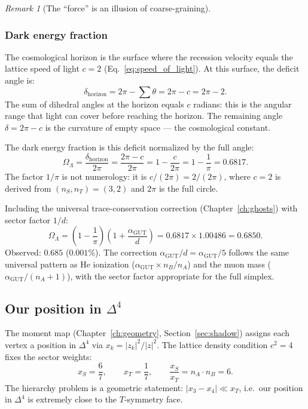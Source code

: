 \documentclass[12pt]{article}
\theoremstyle{remark}
\newtheorem{remark}[theorem]{Remark}
\theoremstyle{definition}
\begin{document}
\begin{remark}[The ``force'' is an illusion of coarse-graining]
\subsubsection{Dark energy fraction}

The cosmological horizon is the surface where the recession velocity equals the lattice speed of light $c = 2$ (Eq.~\ref{eq:speed_of_light}). At this surface, the deficit angle is:
\begin{equation}
\delta_\text{horizon} = 2\pi - \sum\theta = 2\pi - c = 2\pi - 2.
\end{equation}
The sum of dihedral angles at the horizon equals $c$ radians: this is the angular range that light can cover before reaching the horizon. The remaining angle $\delta = 2\pi - c$ is the curvature of empty space --- the cosmological constant.

The dark energy fraction is this deficit normalized by the full angle:
\begin{equation}
\boxed{\Omega_\Lambda = \frac{\delta_\text{horizon}}{2\pi} = \frac{2\pi - c}{2\pi} = 1 - \frac{c}{2\pi} = 1 - \frac{1}{\pi} = 0.6817.}
\end{equation}
The factor $1/\pi$ is not numerology: it is $c/(2\pi) = 2/(2\pi)$, where $c = 2$ is derived from $(n_S, n_T) = (3, 2)$ and $2\pi$ is the full circle.

Including the universal trace-conservation correction (Chapter~\ref{ch:ghosts}) with sector factor $1/d$:
\begin{equation}
\boxed{\Omega_\Lambda = \left(1 - \frac{1}{\pi}\right)\!\left(1 + \frac{\alpha_\mathrm{GUT}}{d}\right) = 0.6817 \times 1.00486 = 0.6850.}
\end{equation}
Observed: $0.685$ ($0.001\%$).  The correction $\alpha_\mathrm{GUT}/d = \alpha_\mathrm{GUT}/5$ follows the same universal pattern as He ionization ($\alpha_\mathrm{GUT} \times n_B/n_A$) and the muon mass ($\alpha_\mathrm{GUT}/(n_A+1)$), with the sector factor appropriate for the full simplex.

\subsection{Our position in $\Delta^4$}
\label{sec:our_position}

The moment map (Chapter~\ref{ch:geometry}, Section~\ref{sec:shadow}) assigns each vertex a position in $\Delta^4$ via $x_k = |z_k|^2/|z|^2$.  The lattice density condition $c^2 = 4$ fixes the sector weights:
\begin{equation}
x_S = \frac{6}{7}, \qquad x_T = \frac{1}{7}, \qquad \frac{x_S}{x_T} = n_A \cdot n_B = 6.
\end{equation}
The hierarchy problem is a geometric statement: $|x_3 - x_4| \ll x_T$, i.e.\ our position in $\Delta^4$ is extremely close to the $T$-symmetry face.


\end{remark}
\end{document}
